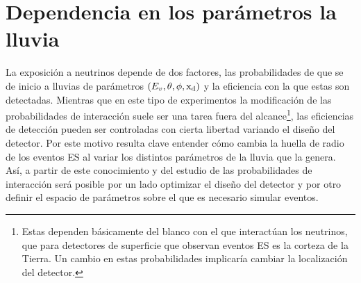 	
% 		
% 	
% 	
% 	
% 	
% 		
	
% 	
% 	
	\section{Dependencia en los par\'ametros la lluvia}
	
	La exposici\'on a neutrinos depende de dos factores, las probabilidades de que se de inicio a lluvias de par\'ametros $(E_v,\theta,\phi,{\rm x_d})$ y la eficiencia con la que estas son detectadas.
	Mientras que en este tipo de experimentos la modificaci\'on de las probabilidades de interacci\'on suele ser una tarea fuera del alcance\footnote{Estas dependen b\'asicamente del blanco con el que interact\'uan los neutrinos, que para detectores de superficie que observan eventos ES es la corteza de la Tierra. 
	Un cambio en estas probabilidades implicar\'ia cambiar la localizaci\'on del detector.}, las eficiencias de detecci\'on pueden ser controladas con cierta libertad variando el dise\~no del detector. 
	Por este motivo resulta clave entender c\'omo cambia la huella de radio de los eventos ES al variar los distintos par\'ametros de la lluvia que la genera.
	As\'i, a partir de este conocimiento y del estudio de las probabilidades de interacci\'on ser\'a posible por un lado optimizar el dise\~no del detector y por otro definir el espacio de par\'ametros sobre el que es necesario simular eventos.
	
